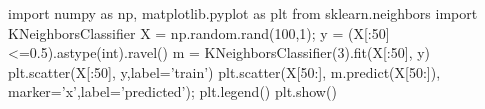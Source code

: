 import numpy as np, matplotlib.pyplot as plt
from sklearn.neighbors import KNeighborsClassifier
X = np.random.rand(100,1); 
y = (X[:50]<=0.5).astype(int).ravel()
m = KNeighborsClassifier(3).fit(X[:50], y)
plt.scatter(X[:50], y,label='train')
plt.scatter(X[50:], m.predict(X[50:]), marker='x',label='predicted'); 
plt.legend()
plt.show()



